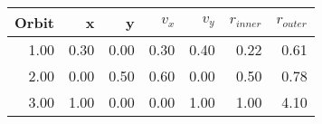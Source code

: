 \begin{tabular}{rrrrrrr}
\toprule
 Orbit &    x &    y &  $v_x$ &  $v_y$ &  $r_{inner}$ &  $r_{outer}$ \\
\midrule
  1.00 & 0.30 & 0.00 &   0.30 &   0.40 &         0.22 &         0.61 \\
  2.00 & 0.00 & 0.50 &   0.60 &   0.00 &         0.50 &         0.78 \\
  3.00 & 1.00 & 0.00 &   0.00 &   1.00 &         1.00 &         4.10 \\
\bottomrule
\end{tabular}
